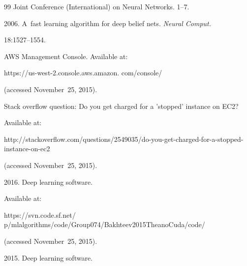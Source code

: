 {{\begin{thebibliography}{99}
{Joint Conference (International) on Neural Networks}. 1--7.











2006. A~fast learning algorithm for deep belief nets. \textit{Neural Comput.}


18:1527--1554.
















AWS Management Console. Available at: {\sf 


https://us-west-2.console.aws.amazon. com/console/} (accessed November~25, 2015).









Stack overflow question: Do you get charged for a 'stopped' instance on EC2? 


Available at: {\sf 


http://stackoverflow.com/questions/2549035/do-you-get-charged-for-a-stopped-instance-on-ec2}


 (accessed November~25, 2015).










 2016. Deep learning software.


Available at: 


{\sf https://svn.code.sf.net/ p/mlalgorithms/code/Group074/Bakhteev2015TheanoCuda/code/} 


(accessed November~25, 2015).










 2015. Deep learning software.



\end{thebibliography}}}
